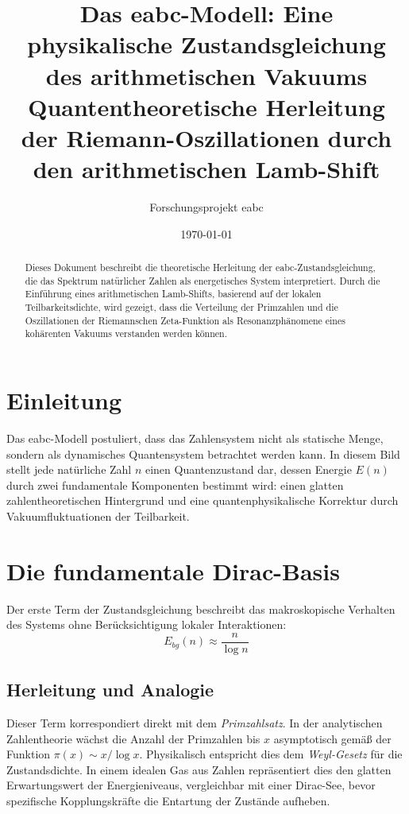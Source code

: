 \documentclass[11pt,a4paper]{article}
\title{\textbf{Das eabc-Modell: Eine physikalische Zustandsgleichung des arithmetischen Vakuums}\\ \large Quantentheoretische Herleitung der Riemann-Oszillationen durch den arithmetischen Lamb-Shift}
\author{Forschungsprojekt eabc}
\date{\today}
\begin{document}
	
	\maketitle
	
	\begin{abstract}
		Dieses Dokument beschreibt die theoretische Herleitung der eabc-Zustandsgleichung, die das Spektrum natürlicher Zahlen als energetisches System interpretiert. Durch die Einführung eines arithmetischen Lamb-Shifts, basierend auf der lokalen Teilbarkeitsdichte, wird gezeigt, dass die Verteilung der Primzahlen und die Oszillationen der Riemannschen Zeta-Funktion als Resonanzphänomene eines kohärenten Vakuums verstanden werden können.
	\end{abstract}
	
	\section{Einleitung}
	Das eabc-Modell postuliert, dass das Zahlensystem nicht als statische Menge, sondern als dynamisches Quantensystem betrachtet werden kann. In diesem Bild stellt jede natürliche Zahl $n$ einen Quantenzustand dar, dessen Energie $E(n)$ durch zwei fundamentale Komponenten bestimmt wird: einen glatten zahlentheoretischen Hintergrund und eine quantenphysikalische Korrektur durch Vakuumfluktuationen der Teilbarkeit.
	
	\section{Die fundamentale Dirac-Basis}
	Der erste Term der Zustandsgleichung beschreibt das makroskopische Verhalten des Systems ohne Berücksichtigung lokaler Interaktionen:
	\begin{equation}
		E_{bg}(n) \approx \frac{n}{\log n}
	\end{equation}
	
	\subsection{Herleitung und Analogie}
	Dieser Term korrespondiert direkt mit dem \textit{Primzahlsatz}. In der analytischen Zahlentheorie wächst die Anzahl der Primzahlen bis $x$ asymptotisch gemäß der Funktion $\pi(x) \sim x / \log x$.
	Physikalisch entspricht dies dem \textit{Weyl-Gesetz} für die Zustandsdichte. In einem idealen Gas aus Zahlen repräsentiert dies den glatten Erwartungswert der Energieniveaus, vergleichbar mit einer Dirac-See, bevor spezifische Kopplungskräfte die Entartung der Zustände aufheben.
	
\end{document}
